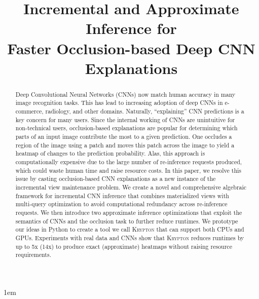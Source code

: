 \documentclass[10pt, sigconf]{acmart}
\begin{document}
\emergencystretch 1em

\title{Incremental and Approximate Inference for\\Faster Occlusion-based Deep CNN Explanations}



\begin{abstract}
Deep Convolutional Neural Networks (CNNs) now match human accuracy in many image recognition tasks. This has lead to increasing adoption of deep CNNs in e-commerce, radiology, and other domains. Naturally, ``explaining'' CNN predictions is a key concern for many users. Since the internal working of CNNs are unintuitive for non-technical users, occlusion-based explanations are popular for determining which parts of an input image contribute the most to a given prediction. One occludes a region of the image using a patch and moves this patch across the image to yield a heatmap of changes to the prediction probability. Alas, this approach is computationally expensive due to the large number of re-inference requests produced, which could waste human time and raise resource costs. In this paper, we resolve this issue by casting occlusion-based CNN explanations as a new instance of the incremental view maintenance problem. We create a novel and comprehensive algebraic framework for incremental CNN inference that combines materialized views with multi-query optimization to avoid computational redundancy across re-inference requests. We then introduce two approximate inference optimizations that exploit the semantics of CNNs and the occlusion task to further reduce runtimes. We prototype our ideas in Python to create a tool we call \textsc{Krypton} that can support both CPUs and GPUs. Experiments with real data and CNNs show that \textsc{Krypton} reduces runtimes by up to 5x (14x) to produce exact (approximate) heatmaps without raising resource requirements.
\end{abstract}

\maketitle



% 




\end{document}
